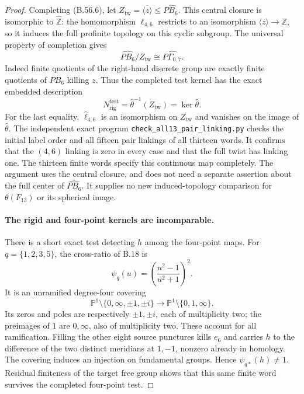 \begin{proof}
Completing (B.56.6), let
$Z_{\mathrm{tw}}=\overline{\langle z\rangle}\leq\widehat{PB_6}$.
This central closure is isomorphic to $\widehat{\mathbb Z}$:
the homomorphism $\ell_{4,6}$ restricts to an isomorphism
$\langle z\rangle\to\mathbb Z$, so it induces the full
profinite topology on this cyclic subgroup.  The universal property of completion
gives
\[
 \widehat{PB_6}/Z_{\mathrm{tw}}\cong\widehat{P\Gamma_{0,7}}.
\]
Indeed finite quotients of the right-hand discrete group are
exactly finite quotients of $PB_6$ killing $z$.
Thus the completed test kernel has the exact embedded description
\[
       N_{\mathrm{rig}}^{\mathrm{test}}
                    =\widehat\theta^{-1}(Z_{\mathrm{tw}})=\ker\widehat\theta.
 \tag{B.56.8}
\]
For the last equality, $\widehat\ell_{4,6}$ is an isomorphism
on $Z_{\mathrm{tw}}$ and vanishes on the image of
$\widehat\theta$.  The independent exact program
\texttt{check\_all13\_pair\_linking.py} checks the initial
label order and all fifteen pair linkings of all thirteen words.
It confirms that the $(4,6)$ linking is zero in every case and
that the full twist has linking one.
The thirteen finite words specify this continuous map completely.
The argument uses the central closure, and does not need a
separate assertion about the full center of $\widehat{PB_6}$.
It supplies no new induced-topology comparison for
$\theta(F_{13})$ or its spherical image.

\paragraph{The rigid and four-point kernels are incomparable.}
There is a short exact test detecting $h$ among the four-point
maps.  For $q=\{1,2,3,5\}$, the cross-ratio of B.18 is
\[
                   \psi_q(u)=\left(\frac{u^2-1}{u^2+1}\right)^2.
 \tag{B.56.9}
\]
It is an unramified degree-four covering
\[
 \mathbb P^1\setminus\{0,\infty,\pm1,\pm i\}
                   \longrightarrow\mathbb P^1\setminus\{0,1,\infty\}.
\]
Its zeros and poles are respectively $\pm1,\pm i$, each of
multiplicity two; the preimages of $1$ are $0,\infty$, also
of multiplicity two.  These account for all ramification.
Filling the other eight source punctures kills $e_6$ and
carries $h$ to the difference of the two distinct meridians
at $1,-1$, nonzero already in homology.  The covering induces
an injection on fundamental groups.  Hence
$\psi_{q*}(h)\ne1$.  Residual finiteness of the target
free group shows that this same finite word survives the
completed four-point test.


\end{proof}
